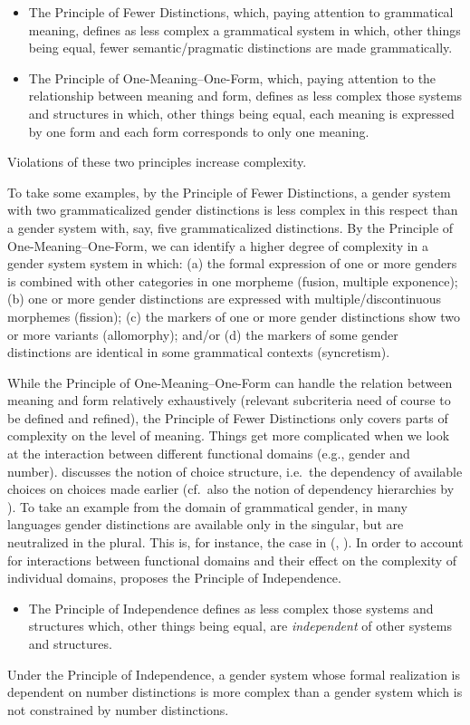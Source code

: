 \documentclass[output=collectionpaper]{langsci/langscibook}
\begin{document}
\begin{itemize}
\item The Principle of Fewer Distinctions, which, paying attention to grammatical meaning, defines as less complex a grammatical system in which, other things being equal, fewer semantic/pragmatic distinctions are made grammatically.
\item  The Principle of One-Meaning–One-Form, which, paying attention to the relationship between meaning and form, defines as less complex those systems and structures in which, other things being equal, each meaning is expressed by one form and each form corresponds to only one meaning.
\end{itemize}
Violations of these two principles increase complexity.

To take some examples, by the Principle of Fewer Distinctions, a gender system with two grammaticalized gender distinctions is less complex in this respect than a gender system with, say, five grammaticalized distinctions. By the Principle of One-Meaning–One-Form, we can identify a higher degree of complexity in a gender system system in which: (a) the formal expression of one or more genders is combined with other categories in one morpheme (fusion, multiple exponence); (b) one or more gender distinctions are expressed with multiple/discontinuous morphemes (fission); (c) the markers of one or more gender distinctions show two or more variants (allomorphy); and/or (d) the markers of some gender distinctions are identical in some grammatical contexts (syncretism).

While the Principle of One-Meaning–One-Form can handle the relation between meaning and form relatively exhaustively (relevant subcriteria need of course to be defined and refined), the Principle of Fewer Distinctions only covers parts of complexity on the level of meaning. Things get more complicated when we look at the interaction between different functional domains (e.g., gender and number). \citet{Dahl2004} discusses the notion of choice structure, i.e.\ the dependency of available choices on choices made earlier (cf.\ also the notion of dependency hierarchies by \citealt{Aikhenvald1998}). To take an example from the domain of grammatical gender, in many languages gender distinctions are available only in the singular, but are neutralized in the plural. This is, for instance, the case in  (, ). In order to account for interactions between functional domains and their effect on the complexity of individual domains, \citet{DiGarbo2014,DiGarbo2016} proposes the Principle of Independence.
\begin{itemize}
    \item The Principle of Independence defines as less complex those systems and structures which, other things being equal, are \textit{independent} of other systems and structures.
\end{itemize}
Under the Principle of Independence, a gender system whose formal realization is dependent on number distinctions is more complex than a gender system which is not constrained by number distinctions.
\end{document}

